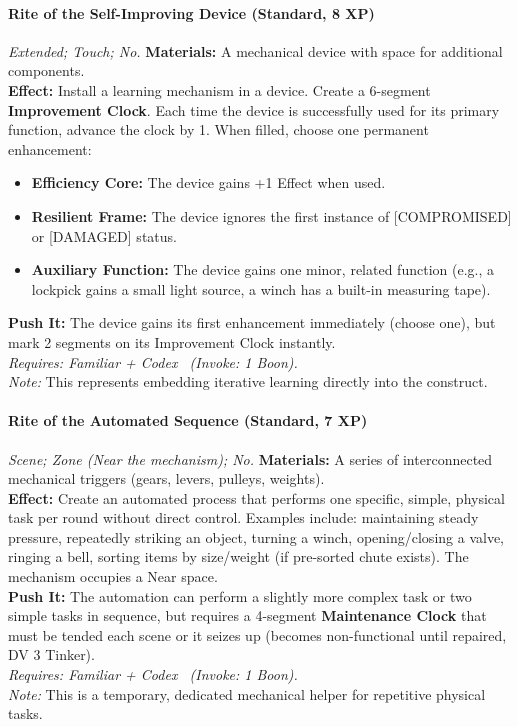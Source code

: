 \paragraph{Rite of the Self-Improving Device (Standard, 8 XP)} \emph{Extended; Touch; No.}
\textbf{Materials:} A mechanical device with space for additional components. \\
\textbf{Effect:} Install a learning mechanism in a device. Create a 6-segment \textbf{Improvement Clock}. Each time the device is successfully used for its primary function, advance the clock by 1. When filled, choose one permanent enhancement:
\begin{itemize}
    \item \textbf{Efficiency Core:} The device gains +1 Effect when used.
    \item \textbf{Resilient Frame:} The device ignores the first instance of [COMPROMISED] or [DAMAGED] status.
    \item \textbf{Auxiliary Function:} The device gains one minor, related function (e.g., a lockpick gains a small light source, a winch has a built-in measuring tape).
\end{itemize}
\textbf{Push It:} The device gains its first enhancement immediately (choose one), but mark 2 segments on its Improvement Clock instantly. \\
\emph{Requires: Familiar + Codex \ (\textit{Invoke:} 1 Boon).} \\
\emph{Note:} This represents embedding iterative learning directly into the construct.

\paragraph{Rite of the Automated Sequence (Standard, 7 XP)} \emph{Scene; Zone (Near the mechanism); No.}
\textbf{Materials:} A series of interconnected mechanical triggers (gears, levers, pulleys, weights). \\
\textbf{Effect:} Create an automated process that performs one specific, simple, physical task per round without direct control. Examples include: maintaining steady pressure, repeatedly striking an object, turning a winch, opening/closing a valve, ringing a bell, sorting items by size/weight (if pre-sorted chute exists). The mechanism occupies a Near space. \\
\textbf{Push It:} The automation can perform a slightly more complex task or two simple tasks in sequence, but requires a 4-segment \textbf{Maintenance Clock} that must be tended each scene or it seizes up (becomes non-functional until repaired, DV 3 Tinker). \\
\emph{Requires: Familiar + Codex \ (\textit{Invoke:} 1 Boon).} \\
\emph{Note:} This is a temporary, dedicated mechanical helper for repetitive physical tasks.

